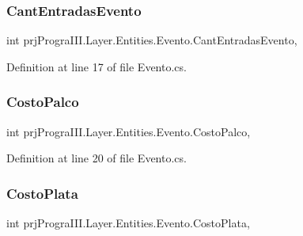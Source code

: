 \subsubsection{\texorpdfstring{Cant\+Entradas\+Evento}{CantEntradasEvento}}
{\footnotesize\ttfamily int prj\+Progra\+I\+I\+I.\+Layer.\+Entities.\+Evento.\+Cant\+Entradas\+Evento\hspace{0.3cm}{\ttfamily [get]}, {\ttfamily [set]}}



Definition at line 17 of file Evento.\+cs.

\hypertarget{classprj_progra_i_i_i_1_1_layer_1_1_entities_1_1_evento_ad91881d10e4aaef3f306a1117483c04c}{}\label{classprj_progra_i_i_i_1_1_layer_1_1_entities_1_1_evento_ad91881d10e4aaef3f306a1117483c04c} 
\subsubsection{\texorpdfstring{Costo\+Palco}{CostoPalco}}
{\footnotesize\ttfamily int prj\+Progra\+I\+I\+I.\+Layer.\+Entities.\+Evento.\+Costo\+Palco\hspace{0.3cm}{\ttfamily [get]}, {\ttfamily [set]}}



Definition at line 20 of file Evento.\+cs.

\hypertarget{classprj_progra_i_i_i_1_1_layer_1_1_entities_1_1_evento_a925de33f44eda9945eea38334f63ea03}{}\label{classprj_progra_i_i_i_1_1_layer_1_1_entities_1_1_evento_a925de33f44eda9945eea38334f63ea03} 
\subsubsection{\texorpdfstring{Costo\+Plata}{CostoPlata}}
{\footnotesize\ttfamily int prj\+Progra\+I\+I\+I.\+Layer.\+Entities.\+Evento.\+Costo\+Plata\hspace{0.3cm}{\ttfamily [get]}, {\ttfamily [set]}}




